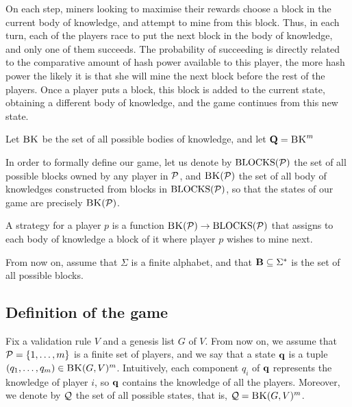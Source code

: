 \documentclass{article}
\begin{document}
On each step, miners looking to maximise their rewards choose a block in the current body of knowledge, and attempt to mine from this block. Thus, in each turn, each of the players race to put the next block in the body of knowledge, and only one of them succeeds. The probability of succeeding is directly related to the comparative amount of hash power available to this player, the more hash power the likely it is that she will mine the next block before the rest of the players. Once a player puts a block, this block is added to the current state, obtaining a different body of knowledge, and the game continues from this new state. 

Let $\text{\sc BK}$ be the set of all possible bodies of knowledge, and let $\mathbf{Q} = \text{\sc BK}^m$


In order to formally define our game, let us denote by $\text{BLOCKS}(\mathcal{P})$ the set of all possible blocks owned by any player in $\mathcal{P}$, and 
$\text{\sc BK}(\mathcal{P})$ the set of all body of knowledges constructed from blocks in $\text{BLOCKS}(\mathcal{P})$, so that the states of our game are precisely 
$\text{\sc BK}(\mathcal{P})$. 

A strategy for a player $p$ is a function $\text{\sc BK}(\mathcal{P}) \rightarrow \text{BLOCKS}(\mathcal{P})$ that assigns to each body of knowledge a block of it 
where player $p$ wishes to mine next. 

From now on, assume that $\Sigma$ is a finite alphabet, and that $\text{\bf B} \subseteq \Sigma^*$ is the set of all possible blocks.  




\subsection{Definition of the game}

Fix a validation rule $V$ and a genesis list $G$ of $V$. From now on, we assume that $\mathcal{P} = \{1, \ldots, m\}$ is a finite set of players, and we say that a state $\mathbf{q}$ is a tuple $(q_1, \ldots, q_m) \in \text{\sc BK}(G,V)^m$. Intuitively, each component $q_i$ of $\mathbf{q}$ represents the knowledge of player $i$, so $\mathbf{q}$ contains the knowledge of all the players. Moreover, we denote by $\mathcal{Q}$ the set of all possible states, that is, $\mathcal{Q} = \text{\sc BK}(G,V)^m$.


\end{document}
